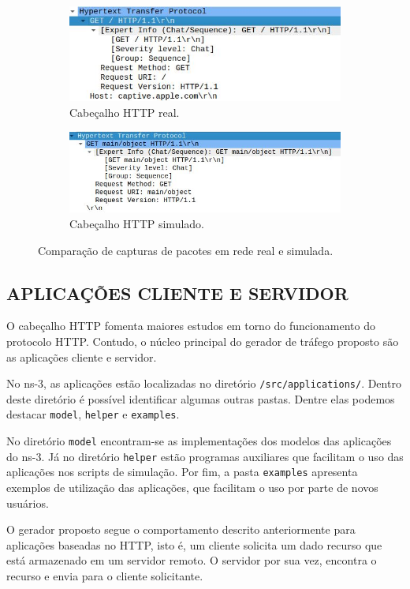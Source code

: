 \begin{figure}[h]
	\centering
	\begin{subfigure}{\textwidth}
		\centering
		\includegraphics[width=0.6\linewidth]{textuais/pcap-real-capture.jpg}
		\caption{Cabeçalho HTTP real.}
	\end{subfigure}
	\begin{subfigure}{\textwidth}
		\centering
		\includegraphics[width=0.6\linewidth]{textuais/pcap-simulated-capture.jpg}
		\caption{Cabeçalho HTTP simulado.}
	\end{subfigure}
	\caption{Comparação de capturas de pacotes em rede real e simulada.}
	\label{fig:pcap-real-simulado}
\end{figure}

\subsection{APLICAÇÕES CLIENTE E SERVIDOR}

O cabeçalho HTTP fomenta maiores estudos em torno do funcionamento do protocolo HTTP. Contudo, o núcleo principal do gerador de tráfego proposto são as aplicações cliente e servidor.

No ns-3, as aplicações estão localizadas no diretório \verb|/src/applications/|. Dentro deste diretório é possível identificar algumas outras pastas. Dentre elas podemos destacar \verb|model|, \verb|helper| e \verb|examples|.

No diretório \verb|model| encontram-se as implementações dos modelos das aplicações do ns-3. Já no diretório \verb|helper| estão programas auxiliares que facilitam o uso das aplicações nos scripts de simulação. Por fim, a pasta \verb|examples| apresenta exemplos de utilização das aplicações, que facilitam o uso por parte de novos usuários.

O gerador proposto segue o comportamento descrito anteriormente para aplicações baseadas no HTTP, isto é, um cliente solicita um dado recurso que está armazenado em um servidor remoto. O servidor por sua vez, encontra o recurso e envia para o cliente solicitante.

